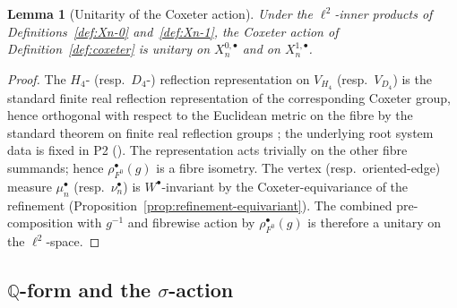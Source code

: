 \documentclass[11pt, a4paper]{amsart}
\newtheorem{lemma}[theorem]{Lemma}
\theoremstyle{definition}
\newcommand{\Q}{\mathbb{Q}}
\begin{document}
\begin{lemma}[Unitarity of the Coxeter action]
\label{lem:coxeter-unitary}
Under the $\ell^2$-inner products of Definitions~\ref{def:Xn-0}
and~\ref{def:Xn-1}, the Coxeter action of
Definition~\ref{def:coxeter} is unitary on
$X_n^{0, \bullet}$ and on $X_n^{1, \bullet}$.
\end{lemma}

\begin{proof}
The $H_4$- (resp.\ $D_4$-) reflection representation on $V_{H_4}$
(resp.\ $V_{D_4}$) is the standard finite real reflection
representation of the corresponding Coxeter group, hence orthogonal
with respect to the Euclidean metric on the fibre by the standard
theorem on finite real reflection groups
\cite[Ch.~1]{Humphreys}; the underlying root
system data is fixed in P2 (\cite[Definition~\texttt{def:V600},
Definition~\texttt{def:V24} and
Proposition~\texttt{prop:24-in-600}]{AlgebraicSubstrate}). The
representation acts trivially on the other fibre summands; hence
$\rho_{F^0}^\bullet(g)$ is a fibre isometry.
The vertex (resp.\ oriented-edge) measure $\mu_n^\bullet$ (resp.\
$\nu_n^\bullet$) is $W^\bullet$-invariant by the
Coxeter-equivariance of the refinement
(Proposition~\ref{prop:refinement-equivariant}).
The combined pre-composition with
$g^{-1}$ and fibrewise action by $\rho_{F^0}^\bullet(g)$ is
therefore a unitary on the $\ell^2$-space.
\end{proof}

\subsection{$\Q$-form and the $\sigma$-action}
\end{document}
